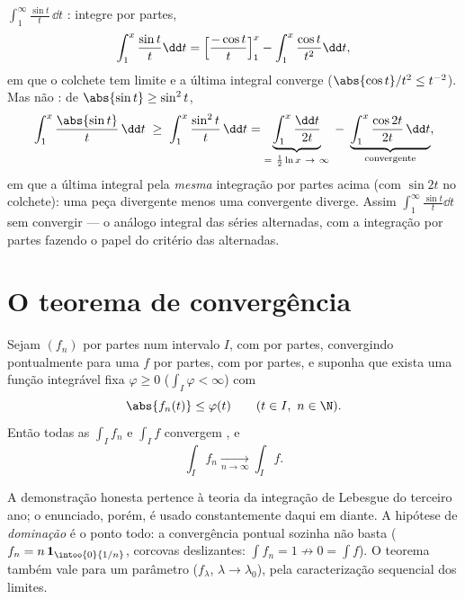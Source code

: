 \begin{example}\label{ex:b2:integration:sint}
$\displaystyle\int_1^{\infty} \frac{\sin t}{t}\,\dd t$ :
integre por partes,
\[
\int_1^x \frac{\sin t}{t}\dd t
= \Bigl[\frac{-\cos t}{t}\Bigr]_1^x - \int_1^x \frac{\cos
t}{t^2}\dd t ,
\]
em que o colchete tem limite e a última integral converge
 ($\abs{\cos t}/t^2 \leq t^{-2}$). Mas não :
de $\abs{\sin t} \geq \sin^2 t$,
\[
\int_1^x \frac{\abs{\sin t}}{t}\,\dd t
\;\geq\; \int_1^x \frac{\sin^2t}{t}\,\dd t
= \underbrace{\int_1^x \frac{\dd t}{2t}}_{=\ \frac12\ln x
\ \to\ \infty}
\;-\; \underbrace{\int_1^x \frac{\cos 2t}{2t}\,\dd
t}_{\text{convergente}} ,
\]
em que a última integral  pela \emph{mesma}
integração por partes acima (com $\sin 2t$ no colchete):
uma peça divergente menos uma convergente diverge. Assim
$\int_1^\infty\frac{\sin t}{t}\dd t$  sem convergir
 --- o análogo integral das
séries alternadas, com a integração por partes fazendo o papel
do critério das alternadas.
\end{example}

\section{O teorema de convergência}

\begin{theorem}\label{thm:b2:integration:dominated}
Sejam $(f_n)$  por partes num intervalo $I$, com  por partes, convergindo
pontualmente para uma $f$  por partes, com  por partes, e suponha que exista uma
função integrável fixa $\varphi \geq 0$ ($\int_I \varphi < \infty$)
com
\[
\abs{f_n(t)} \leq \varphi(t) \qquad (t \in I,\ n \in \N).
\]
Então todas as $\int_I f_n$ e $\int_I f$ convergem , e
\[
\int_I f_n \xrightarrow[n \to \infty]{} \int_I f .
\]
\end{theorem}
\admitted

\begin{remark}
A demonstração honesta pertence à teoria da integração de Lebesgue do terceiro
ano; o enunciado, porém, é usado constantemente daqui em diante. A hipótese de
\emph{dominação} é o ponto todo: a convergência pontual
sozinha não basta ($f_n = n\,\mathbf{1}_{\intoo{0}{1/n}}$,
corcovas deslizantes: $\int f_n = 1 \not\to 0 = \int f$). O teorema
também vale para um parâmetro  ($f_\lambda$, $\lambda \to
\lambda_0$), pela caracterização sequencial dos limites.
\end{remark}

